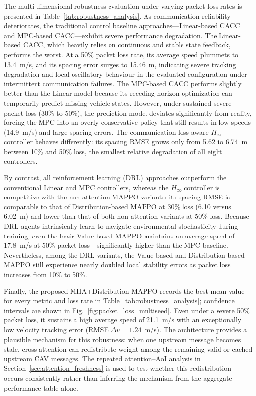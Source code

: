 \documentclass{ieeeaccess}
\begin{document}
The multi-dimensional robustness evaluation under varying packet loss rates is presented in Table~\ref{tab:robustness_analysis}. As communication reliability deteriorates, the traditional control baseline approaches—Linear-based CACC and MPC-based CACC—exhibit severe performance degradation. The Linear-based CACC, which heavily relies on continuous and stable state feedback, performs the worst. At a 50\% packet loss rate, its average speed plummets to 13.4~m/s, and its spacing error surges to 15.46~m, indicating severe tracking degradation and local oscillatory behaviour in the evaluated configuration under intermittent communication failures. The MPC-based CACC performs slightly better than the Linear model because its receding horizon optimization can temporarily predict missing vehicle states. However, under sustained severe packet loss (30\% to 50\%), the prediction model deviates significantly from reality, forcing the MPC into an overly conservative policy that still results in low speeds (14.9~m/s) and large spacing errors. The communication-loss-aware $H_\infty$ controller behaves differently: its spacing RMSE grows only from 5.62 to 6.74~m between 10\% and 50\% loss, the smallest relative degradation of all eight controllers. %

By contrast, all reinforcement learning (DRL) approaches outperform the conventional Linear and MPC controllers, whereas the $H_\infty$ controller is competitive with the non-attention MAPPO variants: its spacing RMSE is comparable to that of Distribution-based MAPPO at 30\% loss (6.10 versus 6.02~m) and lower than that of both non-attention variants at 50\% loss. Because DRL agents intrinsically learn to navigate environmental stochasticity during training, even the basic Value-based MAPPO maintains an average speed of 17.8~m/s at 50\% packet loss—significantly higher than the MPC baseline. Nevertheless, among the DRL variants, the Value-based and Distribution-based MAPPO still experience nearly doubled local stability errors as packet loss increases from 10\% to 50\%.

Finally, the proposed MHA+Distribution MAPPO records the best mean value for every metric and loss rate in Table~\ref{tab:robustness_analysis}; confidence intervals are shown in Fig.~\ref{fig:packet_loss_multiseed}. Even under a severe 50\% packet loss, it sustains a high average speed of 21.1~m/s with an exceptionally low velocity tracking error (RMSE $\Delta v = 1.24$~m/s). The architecture provides a plausible mechanism for this robustness: when one upstream message becomes stale, cross-attention can redistribute weight among the remaining valid or cached upstream CAV messages. The repeated attention--AoI analysis in Section~\ref{sec:attention_freshness} is used to test whether this redistribution occurs consistently rather than inferring the mechanism from the aggregate performance table alone. %
\end{document}
